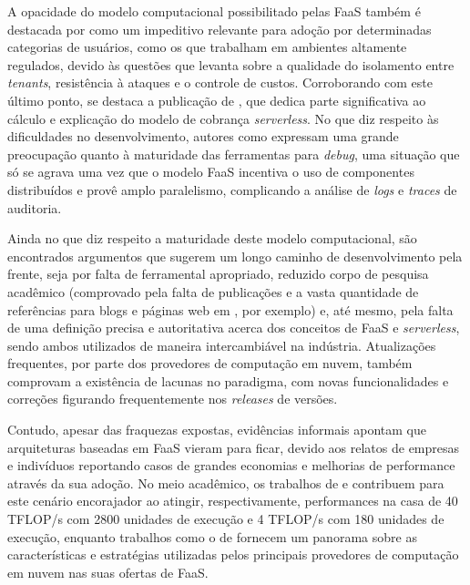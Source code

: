 \documentclass[english,brazilian]{UNISINOSmonografia} %
\begin{document}
A opacidade do modelo computacional possibilitado pelas FaaS também é destacada por  como um impeditivo relevante para adoção por determinadas categorias de usuários, como os que trabalham em ambientes altamente regulados, devido às questões que levanta sobre a qualidade do isolamento entre \textit{tenants}, resistência à ataques e o controle de custos.
Corroborando com este último ponto, se destaca a publicação de , que dedica parte significativa ao cálculo e explicação do modelo de cobrança \textit{serverless}.
No que diz respeito às dificuldades no desenvolvimento, autores como  expressam uma grande preocupação quanto à maturidade das ferramentas para \textit{debug}, uma situação que só se agrava uma vez que o modelo FaaS incentiva o uso de componentes distribuídos e provê amplo paralelismo, complicando a análise de \textit{logs} e \textit{traces} de auditoria.


Ainda no que diz respeito a maturidade deste modelo computacional, são encontrados argumentos que sugerem um longo caminho de desenvolvimento pela frente, seja por falta de ferramental apropriado, reduzido corpo de pesquisa acadêmico (comprovado pela falta de publicações e a vasta quantidade de referências para blogs e páginas web em \cite{Wang2018}, por exemplo) e, até mesmo, pela falta de uma definição precisa e autoritativa acerca dos conceitos de FaaS e \textit{serverless}, sendo ambos utilizados de maneira intercambiável na indústria.
Atualizações frequentes, por parte dos provedores de computação em nuvem, também comprovam a existência de lacunas no paradigma, com novas funcionalidades e correções figurando frequentemente nos \textit{releases} de versões.



Contudo, apesar das fraquezas expostas, evidências informais apontam que arquiteturas baseadas em FaaS vieram para ficar, devido aos relatos de empresas e indivíduos reportando casos de grandes economias e melhorias de performance através da sua adoção.
No meio acadêmico, os trabalhos de  e  contribuem para este cenário encorajador ao atingir, respectivamente, performances na casa de 40 TFLOP/s com 2800 unidades de execução e  4 TFLOP/s com 180 unidades de execução, enquanto trabalhos como o de  fornecem um panorama sobre as características e estratégias utilizadas pelos principais provedores de computação em nuvem nas suas ofertas de FaaS.
\end{document}
